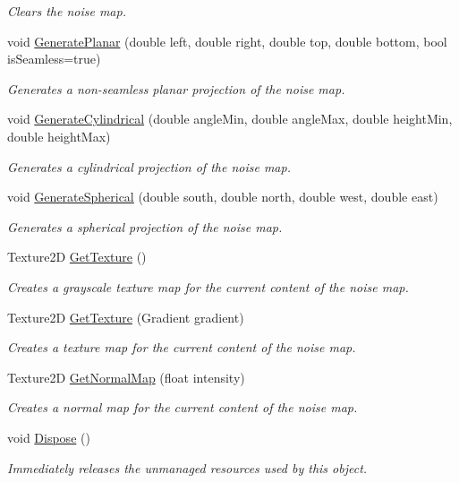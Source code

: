 \begin{DoxyCompactItemize}
\begin{DoxyCompactList}\small\item\em Clears the noise map. \end{DoxyCompactList}\item 
void \hyperlink{class_lib_noise_1_1_noise2_d_ac771707226342fb931f5d25365728503}{Generate\+Planar} (double left, double right, double top, double bottom, bool is\+Seamless=true)
\begin{DoxyCompactList}\small\item\em Generates a non-\/seamless planar projection of the noise map. \end{DoxyCompactList}\item 
void \hyperlink{class_lib_noise_1_1_noise2_d_a02daa1c914c5dd0dc590f6f879661091}{Generate\+Cylindrical} (double angle\+Min, double angle\+Max, double height\+Min, double height\+Max)
\begin{DoxyCompactList}\small\item\em Generates a cylindrical projection of the noise map. \end{DoxyCompactList}\item 
void \hyperlink{class_lib_noise_1_1_noise2_d_a68c918170dee86068f4afcba0734e5e0}{Generate\+Spherical} (double south, double north, double west, double east)
\begin{DoxyCompactList}\small\item\em Generates a spherical projection of the noise map. \end{DoxyCompactList}\item 
Texture2D \hyperlink{class_lib_noise_1_1_noise2_d_a8f5efbd701d1f20f2a9a6c0631283749}{Get\+Texture} ()
\begin{DoxyCompactList}\small\item\em Creates a grayscale texture map for the current content of the noise map. \end{DoxyCompactList}\item 
Texture2D \hyperlink{class_lib_noise_1_1_noise2_d_ac378ab504b642e6da63ae4e3c3384b4f}{Get\+Texture} (Gradient gradient)
\begin{DoxyCompactList}\small\item\em Creates a texture map for the current content of the noise map. \end{DoxyCompactList}\item 
Texture2D \hyperlink{class_lib_noise_1_1_noise2_d_ab34a1fa5128c92fc67198038df677b35}{Get\+Normal\+Map} (float intensity)
\begin{DoxyCompactList}\small\item\em Creates a normal map for the current content of the noise map. \end{DoxyCompactList}\item 
void \hyperlink{class_lib_noise_1_1_noise2_d_a624a63bd15c55bd226258058726354b3}{Dispose} ()
\begin{DoxyCompactList}\small\item\em Immediately releases the unmanaged resources used by this object. \end{DoxyCompactList}\end{DoxyCompactItemize}
